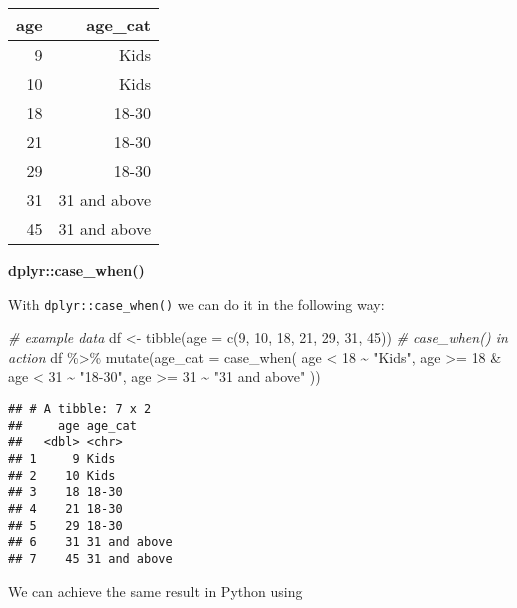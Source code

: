 \documentclass[
]{book}
\newenvironment{Shaded}{\begin{snugshade}}{\end{snugshade}}
\newcommand{\AttributeTok}[1]{\textcolor[rgb]{0.77,0.63,0.00}{#1}}
\newcommand{\CommentTok}[1]{\textcolor[rgb]{0.56,0.35,0.01}{\textit{#1}}}
\newcommand{\DecValTok}[1]{\textcolor[rgb]{0.00,0.00,0.81}{#1}}
\newcommand{\FunctionTok}[1]{\textcolor[rgb]{0.00,0.00,0.00}{#1}}
\newcommand{\NormalTok}[1]{#1}
\newcommand{\OtherTok}[1]{\textcolor[rgb]{0.56,0.35,0.01}{#1}}
\newcommand{\SpecialCharTok}[1]{\textcolor[rgb]{0.00,0.00,0.00}{#1}}
\newcommand{\StringTok}[1]{\textcolor[rgb]{0.31,0.60,0.02}{#1}}
\begin{document}
\begin{longtable}[]{@{}rr@{}}
\toprule
age & age\_cat \\
\midrule
\endhead
9 & Kids \\
10 & Kids \\
18 & 18-30 \\
21 & 18-30 \\
29 & 18-30 \\
31 & 31 and above \\
45 & 31 and above \\
\bottomrule
\end{longtable}

\textbf{dplyr::case\_when()}

With \texttt{dplyr::case\_when()} we can do it in the following way:

\begin{Shaded}
\begin{Highlighting}[]
\CommentTok{\# example data}
\NormalTok{df }\OtherTok{\textless{}{-}} \FunctionTok{tibble}\NormalTok{(}\AttributeTok{age =} \FunctionTok{c}\NormalTok{(}\DecValTok{9}\NormalTok{, }\DecValTok{10}\NormalTok{, }\DecValTok{18}\NormalTok{, }\DecValTok{21}\NormalTok{, }\DecValTok{29}\NormalTok{, }\DecValTok{31}\NormalTok{, }\DecValTok{45}\NormalTok{))}
\CommentTok{\# case\_when() in action}
\NormalTok{df }\SpecialCharTok{\%\textgreater{}\%} 
  \FunctionTok{mutate}\NormalTok{(}\AttributeTok{age\_cat =} \FunctionTok{case\_when}\NormalTok{(}
\NormalTok{    age }\SpecialCharTok{\textless{}} \DecValTok{18} \SpecialCharTok{\textasciitilde{}} \StringTok{"Kids"}\NormalTok{,}
\NormalTok{    age }\SpecialCharTok{\textgreater{}=} \DecValTok{18} \SpecialCharTok{\&}\NormalTok{ age }\SpecialCharTok{\textless{}} \DecValTok{31} \SpecialCharTok{\textasciitilde{}} \StringTok{"18{-}30"}\NormalTok{,}
\NormalTok{    age }\SpecialCharTok{\textgreater{}=} \DecValTok{31} \SpecialCharTok{\textasciitilde{}} \StringTok{"31 and above"}
\NormalTok{  ))}
\end{Highlighting}
\end{Shaded}

\begin{verbatim}
## # A tibble: 7 x 2
##     age age_cat     
##   <dbl> <chr>       
## 1     9 Kids        
## 2    10 Kids        
## 3    18 18-30       
## 4    21 18-30       
## 5    29 18-30       
## 6    31 31 and above
## 7    45 31 and above
\end{verbatim}

We can achieve the same result in Python using
\end{document}
